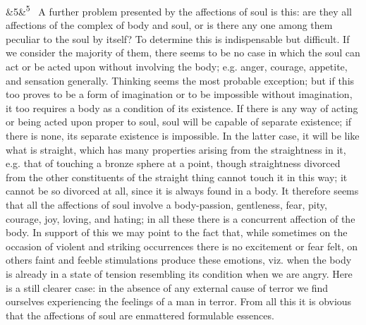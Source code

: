 \documentclass[12pt]{article}
\newcommand{\para}[1][]{\par\noindent\ifx&#1&\else\textsuperscript{\footnotesize #1}~\fi}
\begin{document}
\para[5] A further problem presented by the affections of soul is this: are they all affections of the complex of body and soul, or is there any one among them peculiar to the soul by itself? To determine this is indispensable but difficult. If we consider the majority of them, there seems to be no case in which the soul can act or be acted upon without involving the body; e.g. anger, courage, appetite, and sensation generally. Thinking seems the most probable exception; but if this too proves to be a form of imagination or to be impossible without imagination, it too requires a body as a condition of its existence. If there is any way of acting or being acted upon proper to soul, soul will be capable of separate existence; if there is none, its separate existence is impossible. In the latter case, it will be like what is straight, which has many properties arising from the straightness in it, e.g. that of touching a bronze sphere at a point, though straightness divorced from the other constituents of the straight thing cannot touch it in this way; it cannot be so divorced at all, since it is always found in a body. It therefore seems that all the affections of soul involve a body-passion, gentleness, fear, pity, courage, joy, loving, and hating; in all these there is a concurrent affection of the body. In support of this we may point to the fact that, while sometimes on the occasion of violent and striking occurrences there is no excitement or fear felt, on others faint and feeble stimulations produce these emotions, viz. when the body is already in a state of tension resembling its condition when we are angry. Here is a still clearer case: in the absence of any external cause of terror we find ourselves experiencing the feelings of a man in terror. From all this it is obvious that the affections of soul are enmattered formulable essences.
\end{document}
